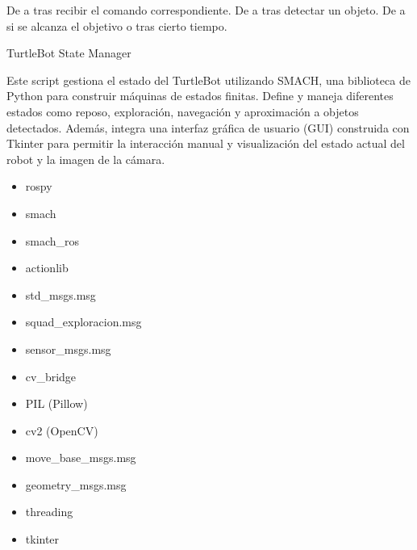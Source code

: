 \documentclass[a4paper,10pt,spanish]{sphinxmanual}
\begin{document}
\sphinxAtStartPar
{}
\sphinxhyphen{} De  a  tras recibir el comando correspondiente.
\sphinxhyphen{} De  a  tras detectar un objeto.
\sphinxhyphen{} De  a  si se alcanza el objetivo o tras cierto tiempo.

\label{\detokenize{squad_state_manager:module-squad_state_manager}}
\sphinxAtStartPar
TurtleBot State Manager

\sphinxAtStartPar
Este script gestiona el estado del TurtleBot utilizando SMACH, una biblioteca de Python
para construir máquinas de estados finitas. Define y maneja diferentes estados como
reposo, exploración, navegación y aproximación a objetos detectados. Además, integra
una interfaz gráfica de usuario (GUI) construida con Tkinter para permitir la interacción
manual y visualización del estado actual del robot y la imagen de la cámara.
\begin{description}
\begin{itemize}
\item {} 
\sphinxAtStartPar
rospy

\item {} 
\sphinxAtStartPar
smach

\item {} 
\sphinxAtStartPar
smach\_ros

\item {} 
\sphinxAtStartPar
actionlib

\item {} 
\sphinxAtStartPar
std\_msgs.msg

\item {} 
\sphinxAtStartPar
squad\_exploracion.msg

\item {} 
\sphinxAtStartPar
sensor\_msgs.msg

\item {} 
\sphinxAtStartPar
cv\_bridge

\item {} 
\sphinxAtStartPar
PIL (Pillow)

\item {} 
\sphinxAtStartPar
cv2 (OpenCV)

\item {} 
\sphinxAtStartPar
move\_base\_msgs.msg

\item {} 
\sphinxAtStartPar
geometry\_msgs.msg

\item {} 
\sphinxAtStartPar
threading

\item {} 
\sphinxAtStartPar
tkinter

\end{itemize}

\end{description}
\end{document}
